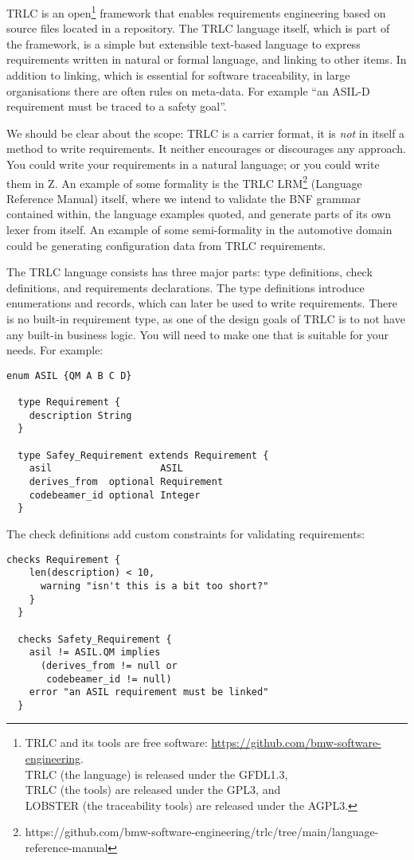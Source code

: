 \documentclass[english]{lni}
\begin{document}
TRLC is an open\footnote{TRLC and its tools are free software:
  \url{https://github.com/bmw-software-engineering}.\\TRLC (the
  language) is released under the GFDL1.3,\\TRLC (the tools) are
  released under the GPL3, and\\LOBSTER (the traceability tools) are
  released under the AGPL3.}  framework that enables requirements
engineering based on source files located in a repository. The TRLC
language itself, which is part of the framework, is a simple but
extensible text-based language to express requirements written in
natural or formal language, and linking to other items. In addition to
linking, which is essential for software traceability, in large
organisations there are often rules on meta-data. For example ``an
ASIL-D requirement must be traced to a safety goal''.

We should be clear about the scope: TRLC is a carrier format, it is
\emph{not} in itself a method to write requirements. It neither
encourages or discourages any approach. You could write your
requirements in a natural language; or you could write them in
Z\cite{z}. An example of some formality is the TRLC
LRM\footnote{https://github.com/bmw-software-engineering/trlc/tree/main/language-reference-manual}
(Language Reference Manual) itself, where we intend to validate the
BNF grammar contained within, the language examples quoted, and
generate parts of its own lexer from itself. An example of some
semi-formality in the automotive domain could be generating
configuration data from TRLC requirements.

The TRLC language consists has three major parts: type definitions,
check definitions, and requirements declarations.  The type
definitions introduce enumerations and records, which can later be
used to write requirements. There is no built-in requirement type, as
one of the design goals of TRLC is to not have any built-in business
logic. You will need to make one that is suitable for your needs. For
example:
\begin{lstlisting}[gobble=2,language=TRLC]
  enum ASIL {QM A B C D}

  type Requirement {
    description String
  }

  type Safey_Requirement extends Requirement {
    asil                   ASIL
    derives_from  optional Requirement
    codebeamer_id optional Integer
  }
\end{lstlisting}

The check definitions add custom constraints for validating
requirements:
\begin{lstlisting}[gobble=2,language=TRLC]
  checks Requirement {
    len(description) < 10,
      warning "isn't this is a bit too short?"
    }
  }

  checks Safety_Requirement {
    asil != ASIL.QM implies
      (derives_from != null or
       codebeamer_id != null)
    error "an ASIL requirement must be linked"
  }
\end{lstlisting}
\end{document}
